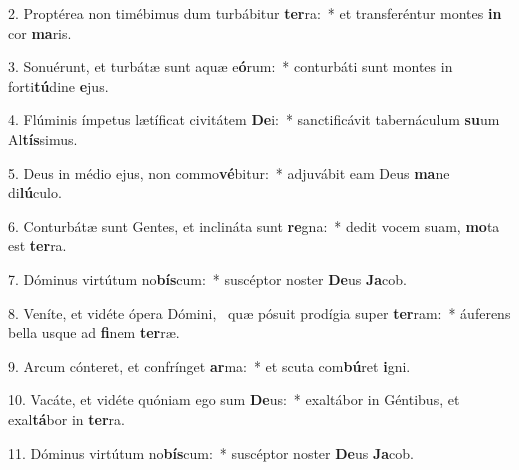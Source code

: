 2. Proptérea non timébimus dum turbábitur \textbf{ter}ra:~*  et transferéntur montes \textbf{in} cor \textbf{ma}ris.\

3. Sonuérunt, et turbátæ sunt aquæ e\textbf{ó}rum:~*  conturbáti sunt montes in forti\textbf{tú}dine \textbf{e}jus.\

4. Flúminis ímpetus lætíficat civitátem \textbf{De}i:~*  sanctificávit tabernáculum \textbf{su}um Al\textbf{tís}simus.\

5. Deus in médio ejus, non commo\textbf{vé}bitur:~*  adjuvábit eam Deus \textbf{ma}ne di\textbf{lú}culo.\

6. Conturbátæ sunt Gentes, et inclináta sunt \textbf{re}gna:~*  dedit vocem suam, \textbf{mo}ta est \textbf{ter}ra.\

7. Dóminus virtútum no\textbf{bís}cum:~*  suscéptor noster \textbf{De}us \textbf{Ja}cob.\

8. Veníte, et vidéte ópera Dómini, \dag\  quæ pósuit prodígia super \textbf{ter}ram:~*  áuferens bella usque ad \textbf{fi}nem \textbf{ter}ræ.\

9. Arcum cónteret, et confrínget \textbf{ar}ma:~*  et scuta com\textbf{bú}ret \textbf{i}gni.\

10. Vacáte, et vidéte quóniam ego sum \textbf{De}us:~*  exaltábor in Géntibus, et exal\textbf{tá}bor in \textbf{ter}ra.\

11. Dóminus virtútum no\textbf{bís}cum:~*  suscéptor noster \textbf{De}us \textbf{Ja}cob.\

